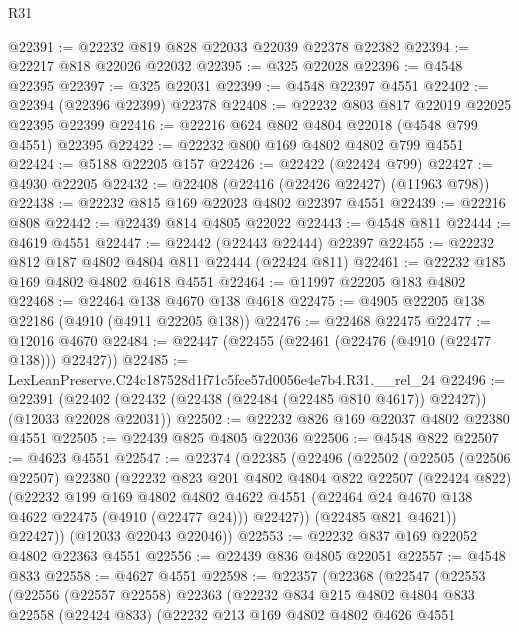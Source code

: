 \begin{lexlean}{R31}
\begin{coremodule}
@22391 := @22232 @819 @828 @22033 @22039 @22378 @22382
@22394 := @22217 @818 @22026 @22032
@22395 := @325 @22028
@22396 := @4548 @22395
@22397 := @325 @22031
@22399 := @4548 @22397 @4551
@22402 := @22394 (@22396 @22399) @22378
@22408 := @22232 @803 @817 @22019 @22025 @22395 @22399
@22416 := @22216 @624 @802 @4804 @22018 (@4548 @799 @4551) @22395
@22422 := @22232 @800 @169 @4802 @4802 @799 @4551
@22424 := @5188 @22205 @157
@22426 := @22422 (@22424 @799)
@22427 := @4930 @22205
@22432 := @22408 (@22416 (@22426 @22427) (@11963 @798))
@22438 := @22232 @815 @169 @22023 @4802 @22397 @4551
@22439 := @22216 @808
@22442 := @22439 @814 @4805 @22022
@22443 := @4548 @811
@22444 := @4619 @4551
@22447 := @22442 (@22443 @22444) @22397
@22455 := @22232 @812 @187 @4802 @4804 @811 @22444 (@22424 @811)
@22461 := @22232 @185 @169 @4802 @4802 @4618 @4551
@22464 := @11997 @22205 @183 @4802
@22468 := @22464 @138 @4670 @138 @4618
@22475 := @4905 @22205 @138 @22186 (@4910 (@4911 @22205 @138))
@22476 := @22468 @22475
@22477 := @12016 @4670
@22484 := @22447 (@22455 (@22461 (@22476 (@4910 (@22477 @138))) @22427))
@22485 := LexLeanPreserve.C24c187528d1f71c5fce57d0056e4e7b4.R31.__rel_24
@22496 := @22391
    (@22402 (@22432 (@22438 (@22484 (@22485 @810 @4617)) @22427)) (@12033 @22028 @22031))
@22502 := @22232 @826 @169 @22037 @4802 @22380 @4551
@22505 := @22439 @825 @4805 @22036
@22506 := @4548 @822
@22507 := @4623 @4551
@22547 := @22374
    (@22385
      (@22496
        (@22502
          (@22505
            (@22506 @22507)
            @22380
            (@22232
              @823
              @201
              @4802
              @4804
              @822
              @22507
              (@22424 @822)
              (@22232
                @199
                @169
                @4802
                @4802
                @4622
                @4551
                (@22464 @24 @4670 @138 @4622 @22475 (@4910 (@22477 @24)))
                @22427))
            (@22485 @821 @4621))
          @22427))
      (@12033 @22043 @22046))
@22553 := @22232 @837 @169 @22052 @4802 @22363 @4551
@22556 := @22439 @836 @4805 @22051
@22557 := @4548 @833
@22558 := @4627 @4551
@22598 := @22357
    (@22368
      (@22547
        (@22553
          (@22556
            (@22557 @22558)
            @22363
            (@22232
              @834
              @215
              @4802
              @4804
              @833
              @22558
              (@22424 @833)
              (@22232
                @213
                @169
                @4802
                @4802
                @4626
                @4551

\end{coremodule}
\end{lexlean}
